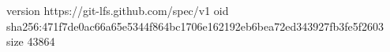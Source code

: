 version https://git-lfs.github.com/spec/v1
oid sha256:471f7de0ac66a65e5344f864bc1706e162192eb6bea72ed343927fb3fe5f2603
size 43864
